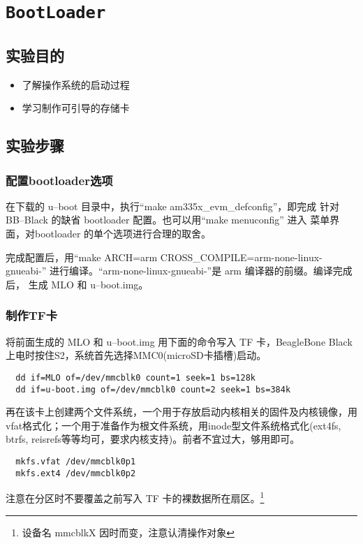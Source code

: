 \chapter{\tt BootLoader}
\section{实验目的}
\begin{itemize}\itemsep=-3pt
  \item 了解操作系统的启动过程
  \item 学习制作可引导的存储卡
\end{itemize}

\section{实验步骤}
\subsection{配置bootloader选项}
	在下载的 u--boot 目录中，执行``make am335x\_evm\_defconfig''，即完成
针对 BB--Black 的缺省 bootloader 配置。也可以用``make menuconfig'' 进入
菜单界面，对bootloader 的单个选项进行合理的取舍。

	完成配置后，用``make ARCH=arm CROSS\_COMPILE=arm-none-linux-gnueabi-''
进行编译。``arm-none-linux-gnueabi-''是 arm 编译器的前缀。编译完成后，
生成 MLO 和 u--boot.img。

\subsection{制作TF卡}
	将前面生成的 MLO 和 u--boot.img 用下面的命令写入 TF 卡，BeagleBone Black
上电时按住S2，系统首先选择MMC0(microSD卡插槽)启动。

\begin{verbatim}
  dd if=MLO of=/dev/mmcblk0 count=1 seek=1 bs=128k
  dd if=u-boot.img of=/dev/mmcblk0 count=2 seek=1 bs=384k
\end{verbatim}

再在该卡上创建两个文件系统，一个用于存放启动内核相关的固件及内核镜像，用
vfat格式化；一个用于准备作为根文件系统，用inode型文件系统格式化(ext4fs, btrfs,
reisrefs等等均可，要求内核支持)。前者不宜过大，够用即可。

\begin{verbatim}
  mkfs.vfat /dev/mmcblk0p1
  mkfs.ext4 /dev/mmcblk0p2
\end{verbatim}

注意在分区时不要覆盖之前写入 TF 卡的裸数据所在扇区。\footnote{设备名 mmcblkX
因时而变，注意认清操作对象}

